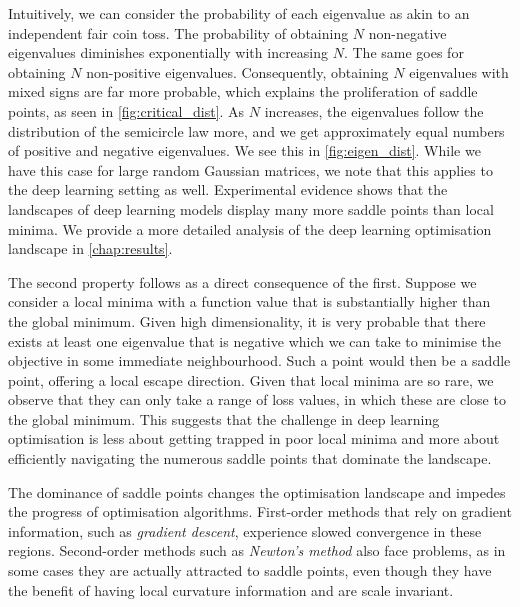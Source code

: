 Intuitively, we can consider the probability of each eigenvalue as akin to an independent fair coin toss. The probability of obtaining $N$ non-negative eigenvalues diminishes exponentially with increasing $N$. The same goes for obtaining $N$ non-positive eigenvalues. Consequently, obtaining $N$ eigenvalues with mixed signs are far more probable, which explains the proliferation of saddle points, as seen in \cref{fig:critical_dist}. As $N$ increases, the eigenvalues follow the distribution of the semicircle law more, and we get approximately equal numbers of positive and negative eigenvalues. We see this in \cref{fig:eigen_dist}. While we have this case for large random Gaussian matrices, we note that this applies to the deep learning setting as well. Experimental evidence shows that the landscapes of deep learning models display many more saddle points than local minima. We provide a more detailed analysis of the deep learning optimisation landscape in \cref{chap:results}.

The second property follows as a direct consequence of the first. Suppose we consider a local minima with a function value that is substantially higher than the global minimum. Given high dimensionality, it is very probable that there exists at least one eigenvalue that is negative which we can take to minimise the objective in some immediate neighbourhood. Such a point would then be a saddle point, offering a local escape direction. Given that local minima are so rare, we observe that they can only take a range of loss values, in which these are close to the global minimum. This suggests that the challenge in deep learning optimisation is less about getting trapped in poor local minima and more about efficiently navigating the numerous saddle points that dominate the landscape. 

The dominance of saddle points changes the optimisation landscape and impedes the progress of optimisation algorithms. First-order methods that rely on gradient information, such as \textit{gradient descent}, experience slowed convergence in these regions. Second-order methods such as \textit{Newton's method} also face problems, as in some cases they are actually attracted to saddle points, even though they have the benefit of having local curvature information and are scale invariant. 

